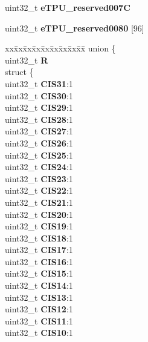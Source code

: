 \begin{DoxyCompactItemize}
\begin{tabbing}
\end{tabbing}\item 
\mbox{\label{structETPU__tag_a41fcd99aa3273e34855d0fb80e8723be}} 
uint32\+\_\+t {\bfseries e\+T\+P\+U\+\_\+reserved007C}
\item 
\mbox{\label{structETPU__tag_a509f9bb3e3a1778135862c30ccd84ee8}} 
uint32\+\_\+t {\bfseries e\+T\+P\+U\+\_\+reserved0080} \mbox{[}96\mbox{]}
\item 
\mbox{\label{structETPU__tag_a0591aeb35bea00f7ae325dff0177ae09}} 
\begin{tabbing}
xx\=xx\=xx\=xx\=xx\=xx\=xx\=xx\=xx\=\kill
union \{\\
\>uint32\_t {\bfseries R}\\
\>struct \{\\
\>\>uint32\_t {\bfseries CIS31}:1\\
\>\>uint32\_t {\bfseries CIS30}:1\\
\>\>uint32\_t {\bfseries CIS29}:1\\
\>\>uint32\_t {\bfseries CIS28}:1\\
\>\>uint32\_t {\bfseries CIS27}:1\\
\>\>uint32\_t {\bfseries CIS26}:1\\
\>\>uint32\_t {\bfseries CIS25}:1\\
\>\>uint32\_t {\bfseries CIS24}:1\\
\>\>uint32\_t {\bfseries CIS23}:1\\
\>\>uint32\_t {\bfseries CIS22}:1\\
\>\>uint32\_t {\bfseries CIS21}:1\\
\>\>uint32\_t {\bfseries CIS20}:1\\
\>\>uint32\_t {\bfseries CIS19}:1\\
\>\>uint32\_t {\bfseries CIS18}:1\\
\>\>uint32\_t {\bfseries CIS17}:1\\
\>\>uint32\_t {\bfseries CIS16}:1\\
\>\>uint32\_t {\bfseries CIS15}:1\\
\>\>uint32\_t {\bfseries CIS14}:1\\
\>\>uint32\_t {\bfseries CIS13}:1\\
\>\>uint32\_t {\bfseries CIS12}:1\\
\>\>uint32\_t {\bfseries CIS11}:1\\
\>\>uint32\_t {\bfseries CIS10}:1\\

\end{tabbing}
\end{DoxyCompactItemize}
